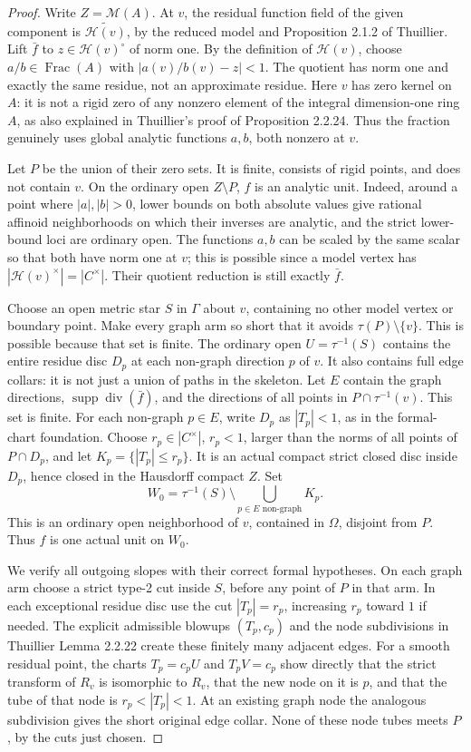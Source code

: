 \documentclass[11pt]{article}
\newcommand{\supp}{\operatorname{supp}}
\begin{document}
\begin{proof}
Write $Z=\mathcal M(A)$. At $v$, the residual function field of the
given component is $\widetilde{\mathcal H(v)}$, by the reduced model
and Proposition 2.1.2 of Thuillier. Lift $\bar f$ to
$z\in\mathcal H(v)^\circ$ of norm one. By the definition of
$\mathcal H(v)$, choose $a/b\in\operatorname{Frac}(A)$ with
$|a(v)/b(v)-z|<1$. The quotient has norm one and exactly the same
residue, not an approximate residue. Here $v$ has zero kernel on
$A$: it is not a rigid zero of any nonzero element of the integral
dimension-one ring $A$, as also explained in Thuillier's proof of
Proposition 2.2.24. Thus the fraction genuinely uses global analytic
functions $a,b$, both nonzero at $v$.

Let $P$ be the union of their zero sets. It is finite, consists of
rigid points, and does not contain $v$. On the ordinary open
$Z\setminus P$, $f$ is an analytic unit. Indeed, around a point
where $|a|,|b|>0$, lower bounds on both absolute values give rational
affinoid neighborhoods on which their inverses are analytic, and
the strict lower-bound loci are ordinary open.
The functions $a,b$ can be scaled by the same scalar so that both
have norm one at $v$; this is possible since a model vertex has
$|\mathcal H(v)^\times|=|C^\times|$. Their quotient reduction is
still exactly $\bar f$.

Choose an open metric star $S$ in $\Gamma$ about $v$, containing
no other model vertex or boundary point. Make every graph arm so
short that it avoids $\tau(P)\setminus\{v\}$. This is possible
because that set is finite. The ordinary open $U=\tau^{-1}(S)$
contains the entire residue disc $D_p$ at each non-graph direction
$p$ of $v$. It also contains full edge collars: it is not just a
union of paths in the skeleton.
Let $E$ contain the graph directions, $\supp\operatorname{div}(\bar f)$,
and the directions of all points in $P\cap\tau^{-1}(v)$.
This set is finite. For each non-graph $p\in E$, write $D_p$ as
$|T_p|<1$, as in the formal-chart foundation. Choose
$r_p\in|C^\times|$, $r_p<1$, larger than the norms of all points
of $P\cap D_p$, and let $K_p=\{|T_p|\leq r_p\}$.
It is an actual compact strict closed disc inside $D_p$, hence
closed in the Hausdorff compact $Z$. Set
\[
                     W_0=\tau^{-1}(S)\setminus\bigcup_{p\in E\text{ non-graph}}K_p.
\]
This is an ordinary open neighborhood of $v$, contained in
$\Omega$, disjoint from $P$. Thus $f$ is one actual unit on $W_0$.

We verify all outgoing slopes with their correct formal hypotheses.
On each graph arm choose a strict type-2 cut inside $S$, before
any point of $P$ in that arm. In each exceptional residue disc
use the cut $|T_p|=r_p$, increasing $r_p$ toward $1$ if needed.
The explicit admissible blowups $(T_p,c_p)$ and the node subdivisions
in Thuillier Lemma 2.2.22 create these finitely many adjacent edges.
For a smooth residual point, the charts $T_p=c_pU$ and $T_pV=c_p$
show directly that the strict transform of $R_v$ is isomorphic to
$R_v$, that the new node on it is $p$, and that the tube of that
node is $r_p<|T_p|<1$. At an existing graph node the analogous
subdivision gives the short original edge collar. None of these
node tubes meets $P$, by the cuts just chosen.


\end{proof}
\end{document}
